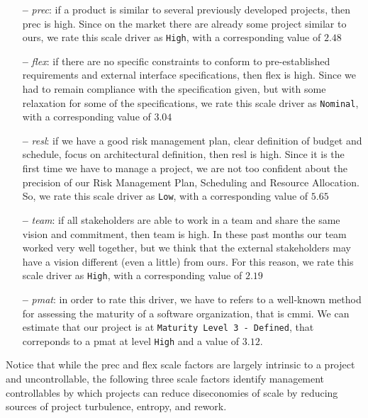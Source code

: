 \begin{itemize}

\item[\textbf{--}] \textit{\acl{prec}}: if a product is similar to several previously developed projects, then \acs{prec} is high. Since on the market there are already some project similar to ours, we rate this scale driver as \texttt{High}, with a corresponding value of $2.48$

\item[\textbf{--}] \textit{\acl{flex}}: if there are no specific constraints to conform to pre-established requirements and external interface specifications, then \acs{flex} is high. Since we had to remain compliance with the specification given, but with some relaxation for some of the specifications, we rate this scale driver as \texttt{Nominal}, with a corresponding value of $3.04$

\item[\textbf{--}] \textit{\acl{resl}}: if we have a good risk management plan, clear definition of budget and schedule, focus on architectural definition, then \acs{resl} is high. Since it is the first time we have to manage a project, we are not too confident about the precision of our Risk Management Plan, Scheduling and Resource Allocation. So, we rate this scale driver as \texttt{Low}, with a corresponding value of $5.65$

\item[\textbf{--}] \textit{\acl{team}}: if all stakeholders are able to work in a team and share the same vision and commitment, then \acs{team} is high. In these past months our team worked very well together, but we think that the external stakeholders may have a vision different (even a little) from ours.
For this reason, we rate this scale driver as \texttt{High}, with a corresponding value of $2.19$

\item[\textbf{--}] \textit{\acl{pmat}}: in order to rate this driver, we have to refers to a well-known method for assessing the maturity of a software organization, that is \acs{cmmi}. We can estimate that our project is at \texttt{Maturity Level 3 - Defined}, that correponds to a \acs{pmat} at level \texttt{High} and a value of $3.12$.

\end{itemize}

Notice that while the \acs{prec} and \acs{flex} scale factors are largely intrinsic to a project and uncontrollable, the following three scale factors identify management controllables by which projects can reduce diseconomies of scale by reducing sources of project turbulence, entropy, and rework.

